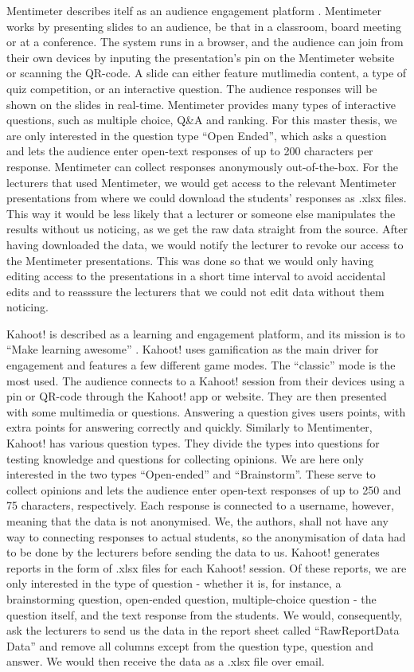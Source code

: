 Mentimeter describes itelf as an audience engagement platform \cite{mentimeterAudienceResponse}. Mentimeter works by presenting slides to an audience, be that in a classroom, board meeting or at a conference. The system runs in a browser, and the audience can join from their own devices by inputing the presentation's pin on the Mentimeter website or scanning the QR-code. A slide can either feature mutlimedia content, a type of quiz competition, or an interactive question. The audience responses will be shown on the slides in real-time. Mentimeter provides many types of interactive questions, such as multiple choice, Q\&A and ranking. For this master thesis, we are only interested in the question type ``Open Ended'', which asks a question and lets the audience enter open-text responses of up to 200 characters per response. Mentimeter can collect responses anonymously out-of-the-box. For the lecturers that used Mentimeter, we would get access to the relevant Mentimeter presentations from where we could download the students' responses as .xlsx files. This way it would be less likely that a lecturer or someone else manipulates the results without us noticing, as we get the raw data straight from the source. After having downloaded the data, we would notify the lecturer to revoke our access to the Mentimeter presentations. This was done so that we would only having editing access to the presentations in a short time interval to avoid accidental edits and to reasssure the lecturers that we could not edit data without them noticing.

Kahoot! is described as a learning and engagement platform, and its mission is to ``Make learning awesome'' \cite{kahootAboutKahoot}. Kahoot! uses gamification as the main driver for engagement and features a few different game modes. The ``classic'' mode is the most used. The audience connects to a Kahoot! session from their devices using a pin or QR-code through the Kahoot! app or website. They are then presented with some multimedia or questions. Answering a question gives users points, with extra points for answering correctly and quickly. Similarly to Mentimenter, Kahoot! has various question types. They divide the types into questions for testing knowledge and questions for collecting opinions. We are here only interested in the two types ``Open-ended'' and ``Brainstorm''. These serve to collect opinions and lets the audience enter open-text responses of up to 250 and 75 characters, respectively. Each response is connected to a username, however, meaning that the data is not anonymised. We, the authors, shall not have any way to connecting responses to actual students, so the anonymisation of data had to be done by the lecturers before sending the data to us. Kahoot! generates reports in the form of .xlsx files for each Kahoot! session. Of these reports, we are only interested in the type of question - whether it is, for instance, a brainstorming question, open-ended question, multiple-choice question - the question itself, and the text response from the students. We would, consequently, ask the lecturers to send us the data in the report sheet called ``RawReportData Data'' and remove all columns except from the question type, question and answer. We would then receive the data as a .xlsx file over email.

